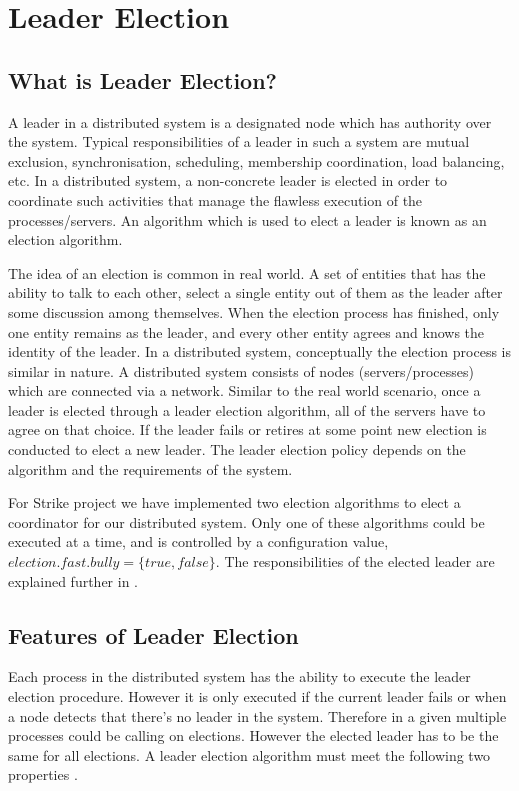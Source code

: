 \documentclass[dareport.tex]{subfiles}
\begin{document}
\section{Leader Election} \label{sec:election}
\subsection{What is Leader Election?}
A leader in a distributed system is a designated node which has authority over the system. Typical responsibilities of a leader in such a system are mutual exclusion, synchronisation, scheduling, membership coordination, load balancing, etc. In a distributed system, a non-concrete leader is elected in order to coordinate such activities that manage the flawless execution of the processes/servers. An algorithm which is used to elect a leader is known as an election algorithm.

The idea of an election is common in real world. A set of entities that has the ability to talk to each other, select a single entity out of them as the leader after some discussion among themselves. When the election process has finished, only one entity remains as the leader, and every other entity agrees and knows the identity of the leader. In a distributed system, conceptually the election process is similar in nature. A distributed system consists of nodes (servers/processes) which are connected via a network. Similar to the real world scenario, once a leader is elected through a leader election algorithm, all of the servers have to agree on that choice. If the leader fails or retires at some point new election is conducted to elect a new leader. The leader election policy depends on the algorithm and the requirements of the system.

For Strike project we have implemented two election algorithms to elect a coordinator for our distributed system. Only one of these algorithms could be executed at a time, and is controlled by a configuration value, $election.fast.bully=\{true, false\}$. The responsibilities of the elected leader are explained further in .

\subsection{Features of Leader Election}
Each process in the distributed system has the ability to execute the leader election procedure. However it is only executed if the current leader fails or when a node detects that there's no leader in the system. Therefore in a given multiple processes could be calling on elections. However the elected leader has to be the same for all elections. A leader election algorithm must meet the following two properties \cite{coulouris}.
\end{document}
